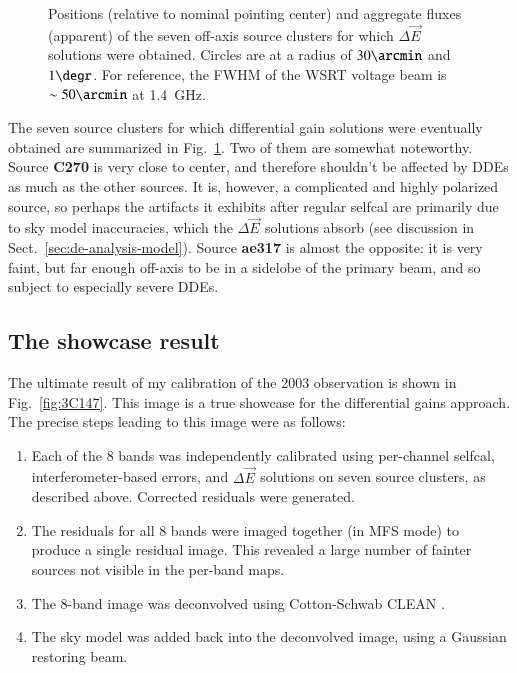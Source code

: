 \documentclass[]{aa}
\newcommand{\jones}[2]{\vec {#1}_{#2}}
\begin{document}
\begin{figure}
\caption{\label{fig:source-plot}Positions (relative to nominal pointing center) and aggregate fluxes (apparent) of the seven off-axis source clusters for which $\Delta\jones{E}{}$ solutions were obtained. Circles are at a radius of $30\arcmin$ and $1\degr$. For reference, the FWHM of the WSRT voltage beam is $\sim50\arcmin$ at 1.4~GHz.}
\end{figure}

The seven source clusters for which differential gain solutions were eventually obtained are summarized in Fig.~\ref{fig:source-plot}. Two of them are somewhat noteworthy. Source {\bf C270} is very close to center, and therefore shouldn't be affected by DDEs as much as the other sources. It is, however, a complicated and highly polarized source, so perhaps the artifacts it exhibits after regular selfcal are primarily due to sky model inaccuracies, which the $\Delta\jones{E}{}$ solutions absorb (see discussion in Sect.~\ref{sec:de-analysis-model}). Source {\bf ae317} is almost the opposite: it is very faint, but far enough off-axis to be in a sidelobe of the primary beam, and so subject to especially severe DDEs.

\subsection{The showcase result} 

The ultimate result of my calibration of the 2003 observation is shown in Fig.~\ref{fig:3C147}. This image is a true showcase for the differential gains approach. The precise steps leading to this image were as follows:

\begin{enumerate}

\item Each of the 8 bands was independently calibrated using per-channel selfcal, interferometer-based errors, and $\Delta\jones{E}{}$ solutions on seven source clusters, as described above. Corrected residuals were generated.

\item The residuals for all 8 bands were imaged together (in MFS mode) to produce a single residual image. This revealed a large number of fainter sources not visible in the per-band maps.

\item The 8-band image was deconvolved using Cotton-Schwab CLEAN \citep{Schwab:csclean}.

\item The sky model was added back into the deconvolved image, using a Gaussian restoring beam.

\end{enumerate}
\end{document}
